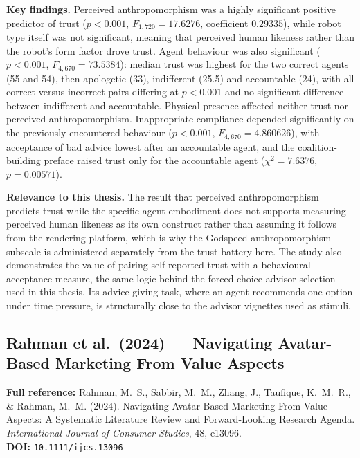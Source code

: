 \documentclass[11pt, a4paper]{article}
\begin{document}
\textbf{Key findings.} Perceived anthropomorphism was a highly significant positive predictor of trust ($p < 0.001$, $F_{1,720} = 17.6276$, coefficient $0.29335$), while robot type itself was not significant, meaning that perceived human likeness rather than the robot's form factor drove trust. Agent behaviour was also significant ($p < 0.001$, $F_{4,670} = 73.5384$): median trust was highest for the two correct agents (55 and 54), then apologetic (33), indifferent (25.5) and accountable (24), with all correct-versus-incorrect pairs differing at $p < 0.001$ and no significant difference between indifferent and accountable. Physical presence affected neither trust nor perceived anthropomorphism. Inappropriate compliance depended significantly on the previously encountered behaviour ($p < 0.001$, $F_{4,670} = 4.860626$), with acceptance of bad advice lowest after an accountable agent, and the coalition-building preface raised trust only for the accountable agent ($\chi^2 = 7.6376$, $p = 0.00571$).

\textbf{Relevance to this thesis.} The result that perceived anthropomorphism predicts trust while the specific agent embodiment does not supports measuring perceived human likeness as its own construct rather than assuming it follows from the rendering platform, which is why the Godspeed anthropomorphism subscale is administered separately from the trust battery here. The study also demonstrates the value of pairing self-reported trust with a behavioural acceptance measure, the same logic behind the forced-choice advisor selection used in this thesis. Its advice-giving task, where an agent recommends one option under time pressure, is structurally close to the advisor vignettes used as stimuli.

\vspace{8pt}

\subsection{Rahman et al.\ (2024) --- Navigating Avatar-Based Marketing From Value Aspects}

\begin{refbox}
\textbf{Full reference:} Rahman, M.~S., Sabbir, M.~M., Zhang, J., Taufique, K.~M.~R., \& Rahman, M.~M. (2024). Navigating Avatar-Based Marketing From Value Aspects: A Systematic Literature Review and Forward-Looking Research Agenda. \textit{International Journal of Consumer Studies}, 48, e13096.\\
\textbf{DOI:} \texttt{10.1111/ijcs.13096}
\end{refbox}
\end{document}
